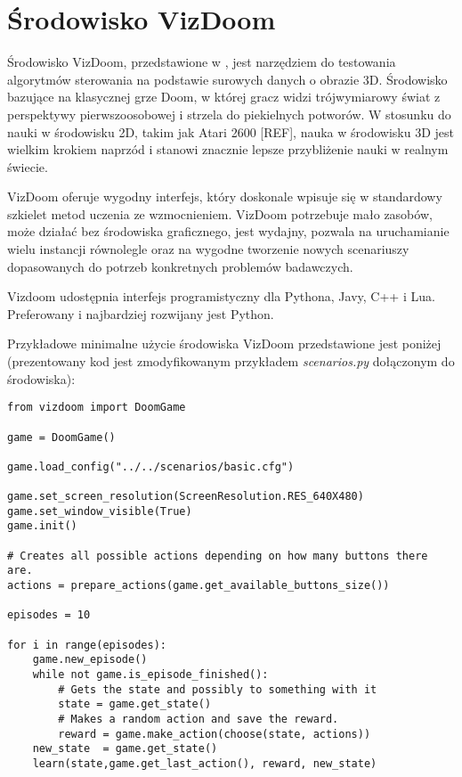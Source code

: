 \section{Środowisko VizDoom}

Środowisko VizDoom, przedstawione w \cite{DBLP:journals/corr/KempkaWRTJ16}, jest narzędziem do testowania algorytmów sterowania na podstawie surowych danych o obrazie 3D. Środowisko bazujące na klasycznej grze Doom, w której gracz widzi trójwymiarowy świat z perspektywy pierwszoosobowej i strzela do piekielnych potworów. W stosunku do nauki w środowisku 2D, takim jak Atari 2600 [REF], nauka w środowisku  3D jest wielkim krokiem naprzód i stanowi znacznie lepsze przybliżenie nauki w realnym świecie.

VizDoom oferuje wygodny interfejs, który doskonale wpisuje się w standardowy szkielet metod uczenia ze wzmocnieniem. VizDoom potrzebuje mało zasobów, może działać bez środowiska graficznego, jest wydajny, pozwala na uruchamianie wielu instancji równolegle oraz na wygodne tworzenie nowych scenariuszy dopasowanych do potrzeb konkretnych problemów badawczych.

Vizdoom udostępnia interfejs programistyczny dla Pythona, Javy, C++ i Lua. Preferowany i najbardziej rozwijany jest Python.

Przykładowe minimalne użycie środowiska VizDoom przedstawione jest poniżej (prezentowany kod jest zmodyfikowanym przykładem \textit{scenarios.py} dołączonym do środowiska):

\begin{lstlisting}[language=iPython]
from vizdoom import DoomGame

game = DoomGame()

game.load_config("../../scenarios/basic.cfg")

game.set_screen_resolution(ScreenResolution.RES_640X480)
game.set_window_visible(True)
game.init()

# Creates all possible actions depending on how many buttons there are.
actions = prepare_actions(game.get_available_buttons_size())

episodes = 10

for i in range(episodes):
    game.new_episode()
    while not game.is_episode_finished():
        # Gets the state and possibly to something with it
        state = game.get_state()
        # Makes a random action and save the reward.
        reward = game.make_action(choose(state, actions))
	new_state  = game.get_state() 
	learn(state,game.get_last_action(), reward, new_state)
\end{lstlisting}
